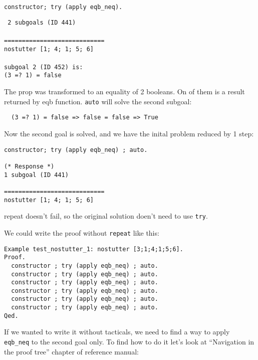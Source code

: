 \documentclass[12pt]{article}
\newcommand{\codeBlock}[1]{\colorbox{cverbbg}{\parbox{0.85\textwidth}{#1}}}
\begin{document}
\begin{verbatim}
constructor; try (apply eqb_neq).
\end{verbatim}

\noindent
\begin{minipage}[t]{.45\textwidth}
\codeBlock{{\tt
2 subgoals (ID 441)\\
\\
============================\\
  nostutter [1; 4; 1; 5; 6]\\
\\
subgoal 2 (ID 452) is:\\
  (3 =? 1) = false
}}
\end{minipage}

\vspace{1em}
The prop was transformed to an equality of 2 booleans. On of them is a result returned by eqb function. {\tt auto} will solve the second subgoal:

\begin{verbatim}
  (3 =? 1) = false => false = false => True
\end{verbatim}

Now the second goal is solved, and we have the inital problem reduced by 1 step:

\begin{verbatim}
constructor; try (apply eqb_neq) ; auto.

(* Response *)
1 subgoal (ID 441)

============================
nostutter [1; 4; 1; 5; 6]
\end{verbatim}

repeat doesn't fail, so the original solution doen't need to use {\tt try}.

We could write the proof without {\tt repeat} like this:

\begin{verbatim}
Example test_nostutter_1: nostutter [3;1;4;1;5;6].
Proof.
  constructor ; try (apply eqb_neq) ; auto.
  constructor ; try (apply eqb_neq) ; auto.
  constructor ; try (apply eqb_neq) ; auto.
  constructor ; try (apply eqb_neq) ; auto.
  constructor ; try (apply eqb_neq) ; auto.
  constructor ; try (apply eqb_neq) ; auto.
Qed.
\end{verbatim}

If we wanted to write it without tacticals, we need to find a way to apply {\tt eqb\_neq} to the second goal only. To find how to do it let's look
at ``Navigation in the proof tree'' chapter of reference manual:
\end{document}
